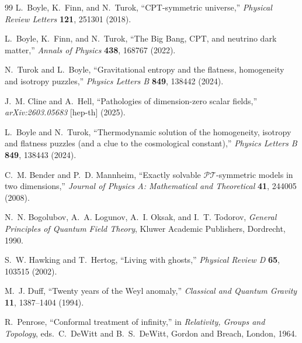 \documentclass[12pt,a4paper]{article}
\theoremstyle{remark}
\begin{document}
\begin{thebibliography}{99}
L.~Boyle, K.~Finn, and N.~Turok,
``CPT-symmetric universe,''
\textit{Physical Review Letters} \textbf{121}, 251301 (2018).

L.~Boyle, K.~Finn, and N.~Turok,
``The Big Bang, CPT, and neutrino dark matter,''
\textit{Annals of Physics} \textbf{438}, 168767 (2022).

N.~Turok and L.~Boyle,
``Gravitational entropy and the flatness, homogeneity and isotropy puzzles,''
\textit{Physics Letters B} \textbf{849}, 138442 (2024).

J.~M. Cline and A.~Hell,
``Pathologies of dimension-zero scalar fields,''
\textit{arXiv:2603.05683} [hep-th] (2025).

L.~Boyle and N.~Turok,
``Thermodynamic solution of the homogeneity, isotropy and flatness puzzles
(and a clue to the cosmological constant),''
\textit{Physics Letters B} \textbf{849}, 138443 (2024).

C.~M. Bender and P.~D. Mannheim,
``Exactly solvable $\mathcal{PT}$-symmetric models in two dimensions,''
\textit{Journal of Physics A: Mathematical and Theoretical} \textbf{41}, 244005 (2008).

N.~N. Bogolubov, A.~A. Logunov, A.~I. Oksak, and I.~T. Todorov,
\textit{General Principles of Quantum Field Theory},
Kluwer Academic Publishers, Dordrecht, 1990.

S.~W. Hawking and T.~Hertog,
``Living with ghosts,''
\textit{Physical Review D} \textbf{65}, 103515 (2002).

M.~J. Duff,
``Twenty years of the Weyl anomaly,''
\textit{Classical and Quantum Gravity} \textbf{11}, 1387--1404 (1994).

R.~Penrose,
``Conformal treatment of infinity,''
in \textit{Relativity, Groups and Topology},
eds.\ C.~DeWitt and B.~S.~DeWitt,
Gordon and Breach, London, 1964.

\end{thebibliography}
\end{document}
